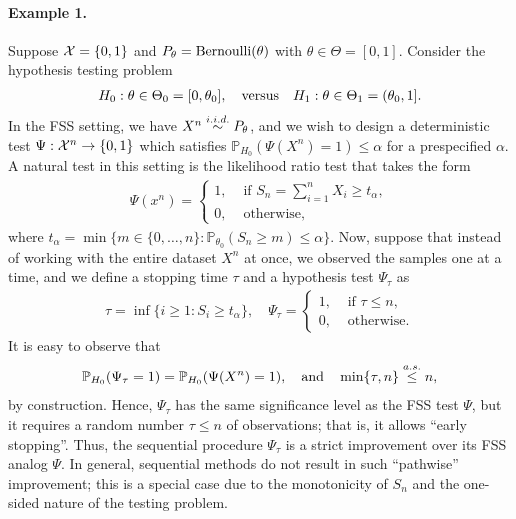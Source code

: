 \documentclass[12pt]{article}
\begin{document}
\paragraph{Example 1.} Suppose ${\cal X} = \{0,1\}$ and $P_\theta = \mathrm{Bernoulli}(\theta)$ with $\theta \in \Theta = [0,1]$. Consider the hypothesis testing problem 
\begin{align}
    H_0: \theta \in \Theta_0 = [0, \theta_0], \quad \text{versus} \quad H_1: \theta \in \Theta_1 = (\theta_0, 1]. 
\end{align}
In the FSS setting, we have $X^n \stackrel{i.i.d.}{\sim} P_\theta$, and we wish to design a deterministic test $\Psi:{\cal X}^n \to \{0,1\}$ which satisfies $\mathbb{P}_{H_0}(\Psi(X^n)=1) \leq \alpha$ for a prespecified $\alpha$. A natural test in this setting is the likelihood ratio test that takes the form 
\begin{align}
    \Psi(x^n) = \begin{cases}
        1, & \text{ if } S_n = \sum_{i=1}^n X_i \geq t_\alpha, \\
        0, & \text{ otherwise}, 
    \end{cases}
\end{align}
where  $t_\alpha = \min \{m \in \{0, \ldots, n\}: \mathbb{P}_{\theta_0}(S_n \geq m) \leq \alpha\}$. Now, suppose that instead of working with the entire dataset $X^n$ at once, we observed the samples one at a time, and we define a stopping time $\tau$ and a hypothesis test $\Psi_\tau$ as  
\begin{align}
    \tau = \inf \{i \geq 1: S_i \geq t_\alpha\}, \quad \Psi_\tau = \begin{cases}
        1,& \text{ if } \tau \leq n, \\
        0, & \text{ otherwise}.  
    \end{cases}
\end{align}
It is easy to observe that 
\begin{align}
    \mathbb{P}_{H_0}(\Psi_\tau = 1) = \mathbb{P}_{H_0}(\Psi(X^n)=1), \quad \text{and} \quad  \min \{\tau, n\} \stackrel{a.s.}{\leq} n, 
\end{align}
by construction. Hence, $\Psi_\tau$ has the same significance level as the FSS test $\Psi$, but it requires a random number $\tau \leq n$ of observations; that is, it allows  ``early stopping''.  Thus, the sequential procedure $\Psi_\tau$ is a strict improvement over its FSS analog $\Psi$. In general, sequential methods do not result in such ``pathwise'' improvement; this is a special case due to the monotonicity of $S_n$ and the one-sided nature of the testing problem. 
\end{document}
